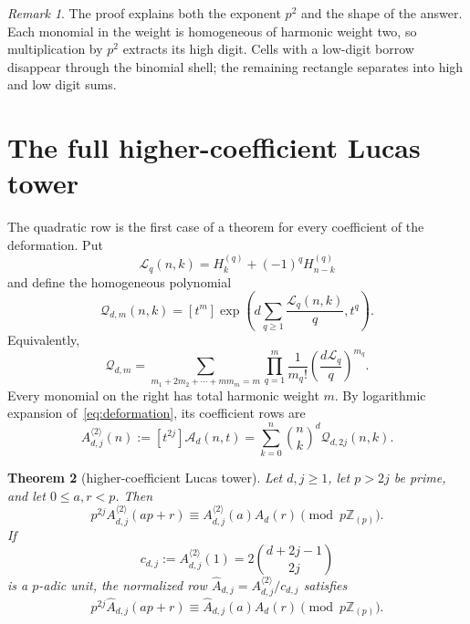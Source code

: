 \documentclass[11pt,reqno]{amsart}
\newtheorem{theorem}{Theorem}[section]
\theoremstyle{definition}
\theoremstyle{remark}
\newtheorem{remark}[theorem]{Remark}
\newcommand{\Zp}{\mathbb Z_{(p)}}
\begin{document}
\begin{remark}
The proof explains both the exponent $p^2$ and the shape of the answer.  Each
monomial in the weight is homogeneous of harmonic weight two, so multiplication
by $p^2$ extracts its high digit.  Cells with a low-digit borrow disappear
through the binomial shell; the remaining rectangle separates into high and low
digit sums.
\end{remark}

\section{The full higher-coefficient Lucas tower}\label{sec:tower}

The quadratic row is the first case of a theorem for every coefficient of the
deformation.  Put
\begin{equation}\label{eq:Lq}
 \mathcal L_q(n,k)=H_k^{(q)}+(-1)^qH_{n-k}^{(q)}
\end{equation}
and define the homogeneous polynomial
\begin{equation}\label{eq:Qdm}
 \mathcal Q_{d,m}(n,k)
 =[t^m]\exp\left(d\sum_{q\geq1}\frac{\mathcal L_q(n,k)}q,t^q\right).
\end{equation}
Equivalently,
\begin{equation}\label{eq:partitionQ}
 \mathcal Q_{d,m}
 =\sum_{m_1+2m_2+\cdots+mm_m=m}
   \prod_{q=1}^{m}\frac1{m_q!}
   \left(\frac{d\mathcal L_q}{q}\right)^{m_q}.
\end{equation}
Every monomial on the right has total harmonic weight $m$.  By logarithmic
expansion of~\eqref{eq:deformation}, its coefficient rows are
\begin{equation}\label{eq:Adj}
 A_{d,j}^{\langle2\rangle}(n)
 :=[t^{2j}]\mathcal A_d(n,t)
 =\sum_{k=0}^n\binom nk^d\mathcal Q_{d,2j}(n,k).
\end{equation}

\begin{theorem}[higher-coefficient Lucas tower]\label{thm:tower}
Let $d,j\geq1$, let $p>2j$ be prime, and let $0\leq a,r<p$.  Then
\begin{equation}\label{eq:tower}
 p^{2j}A_{d,j}^{\langle2\rangle}(ap+r)
 \equiv A_{d,j}^{\langle2\rangle}(a)A_d(r)\pmod {p\Zp}.
\end{equation}
If
\begin{equation}\label{eq:normalizer}
 c_{d,j}:=A_{d,j}^{\langle2\rangle}(1)
 =2\binom{d+2j-1}{2j}
\end{equation}
is a $p$-adic unit, the normalized row
$\widehat A_{d,j}=A_{d,j}^{\langle2\rangle}/c_{d,j}$ satisfies
\begin{equation}\label{eq:towernorm}
 p^{2j}\widehat A_{d,j}(ap+r)
 \equiv\widehat A_{d,j}(a)A_d(r)\pmod {p\Zp}.
\end{equation}
\end{theorem}
\end{document}
